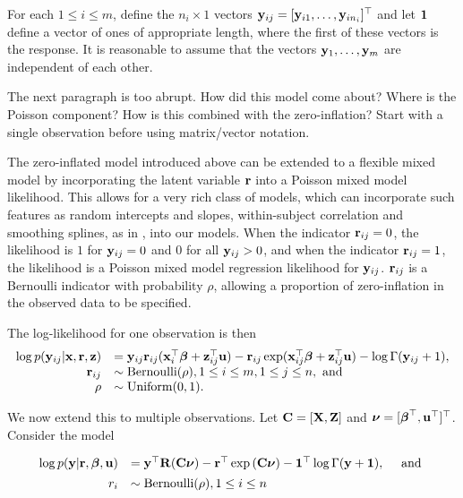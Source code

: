 \documentclass{amsart}[12pt]
\newcommand{\joc}[1]{{\color{red}#1}}
\begin{document}
For each $1 \leq i \leq m$, define the $n_i \times 1$ vectors ${\bf y}_{ij} = [{\bf y}_{i 1}, \ldots, {\bf y}_{i
	n_i}]^\top$ and let ${\bf 1}$ define a vector of ones of appropriate length, where the first of these vectors is
the response. It is reasonable to assume that the vectors ${\bf y}_1, \ldots, {\bf y}_m$ are independent of each
other.

\joc{The next paragraph is too abrupt. How did this model come about? Where is the Poisson component? How is this combined with the zero-inflation?
Start with a single observation before using matrix/vector notation.}

The zero-inflated model introduced above can be extended to a flexible mixed model by incorporating the latent
variable ${\bf r}$ into a Poisson mixed model likelihood. This allows for a very rich class of models, which can
incorporate such features as random intercepts and slopes, within-subject correlation and smoothing splines,
as in \citep{Wand2008}, into our models. When the indicator ${\bf r}_{ij} = 0$, the likelihood is $1$ for
${\bf y}_{ij} = 0$ and $0$ for all ${\bf y}_{ij} > 0$, and when the indicator ${\bf r}_{ij} = 1$, the likelihood is a
Poisson mixed model regression likelihood for ${\bf y}_{ij}$. ${\bf r}_{ij}$ is a Bernoulli indicator with probability
$\rho$, allowing a proportion of zero-inflation in the observed data to be specified.

The log-likelihood for one observation is then
\[
	\begin{array}{rl}
		\log p({\bf y}_{ij} | {\bf x}, {\bf r}, {\bf z}) & = {\bf y}_{ij} {\bf r}_{ij} ({\bf x}_i^\top {\boldsymbol\beta} + {\bf z}_{ij}^\top {\bf u}) - {\bf r}_{ij} \exp ({\bf x}_{ij}^\top {\boldsymbol\beta} + {\bf z}_{ij}^\top {\bf u}) - \log \Gamma ({\bf y}_{ij} + 1), \\
		{\bf r}_{ij}                         & \sim \text{Bernoulli}(\rho), 1 \leq i \leq m, 1 \leq j \leq n, \text{ and }                                                              \\
		\rho                        & \sim \mbox{Uniform}(0, 1).                                                                                              \\
	\end{array}
\]

\noindent We now extend this to multiple observations. Let ${\bf C} = [{\bf X}, {\bf Z}]$ and ${\boldsymbol \nu} = [{\boldsymbol \beta}^\top, {\bf u}^\top]^\top$. Consider the model

\begin{equation}\label{eq:main}
	\begin{array}{rl}
		\log{p({\bf y}|{\bf r}, {\boldsymbol\beta}, {\bf u})} & = {\bf y}^\top {\bf R} ({\bf C}{\boldsymbol \nu}) - {\bf r}^\top \exp{({\bf C}{\boldsymbol\nu})} - {\bf 1}^\top \log{\Gamma{({\bf y}+ {\bf1})}}, \quad \mbox{ and } \\ [1ex]
		r_i                           & \sim \text{Bernoulli}(\rho), 1 \leq i \leq n                                                                     \\
	\end{array}
\end{equation}
\end{document}
